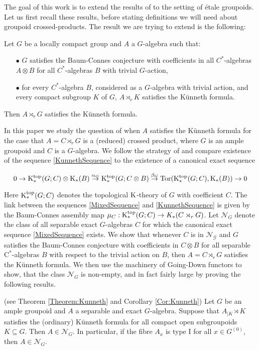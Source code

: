 The goal of this work is to extend the results of \cite{ChabertEOY} to the setting of \'etale groupoids. Let us first recall these results, before stating definitions we will need about groupoid crossed-products. The result we are trying to extend is the following:

\begin{thm} Let $G$ be a locally compact group and $A$ a $G$-algebra such that:
\begin{itemize}
\item[$\bullet$] $G$ satisfies the Baum-Connes conjecture with coefficients in all $C^*$-algebras $A\otimes B$ for all $C^*$-algebras $B$ with trivial $G$-action,
\item[$\bullet$] for every $C^*$-algebra $B$, considered as a $G$-algebra with trivial action, and every compact subgroup $K$ of $G$, $A\rtimes_r K$ satisfies the Künneth formula.
\end{itemize}
Then $A\rtimes_r G$ satisfies the Künneth formula.
\end{thm}

In this paper we study the question of when $A$ satisfies the Künneth formula for the case that $A=C\rtimes_r G$ is a (reduced) crossed product, where $G$ is an ample groupoid and $C$ is a $G$-algebra.
	We follow the strategy of \cite{CEO} and compare existence of the sequence \ref{KunnethSequence} to the existence of a canonical exact sequence

		\begin{equation}\label{MixedSequence}
		0\rightarrow \mathrm K_*^{\mathrm{top}}(G;C)\otimes\mathrm K_*(B)\stackrel{\alpha_G}{\rightarrow}\mathrm K_*^{\mathrm{top}}(G;C\otimes B)\stackrel{\beta_G}{\rightarrow}\mathrm{Tor}(\mathrm K_*^{\mathrm{top}}(G;C),\mathrm K_*(B))\rightarrow 0\\
		\end{equation}

	Here $\mathrm K_*^{\mathrm{top}}(G;C)$ denotes the topological $\mathrm K$-theory of $G$ with coefficient $C$. The link between the sequences \ref{MixedSequence} and \ref{KunnethSequence} is given by the Baum-Connes assembly map $\mu_C:\mathrm K_*^{\mathrm{top}}(G;C)\rightarrow K_*(C\rtimes_r G)$.
	Let $\mathcal{N}_G$ denote the class of all separable exact $G$-algebras $C$ for which the canonical exact sequence \ref{MixedSequence} exists. We show that whenever $C$ is in $\mathcal{N_G}$ and $G$ satisfies the Baum-Connes conjecture with coefficients in $C\otimes B$ for all separable $\mathrm{C}^*$-algebras $B$ with respect to the trivial action on $B$, then $A=C\rtimes_r G$ satisfies the Künneth formula.
	We then use the machinery of Going-Down functors to show, that the class $\mathcal{N}_G$ is non-empty, and in fact fairly large by proving the following results.
	\begin{thmx}(see Theorem \ref{Theorem:Kunneth} and Corollary \ref{Cor:Kunneth})
		Let $G$ be an ample groupoid and $A$ a separable and exact $G$-algebra. Suppose that $A_{\mid K}\rtimes K$ satisfies the (ordinary) Künneth formula for all compact open subgroupoids $K\subseteq G$. Then $A\in \mathcal{N}_G$. In particular, if the fibre $A_x$ is type I for all $x\in G^{(0)}$, then $A\in \mathcal{N}_G$.
	\end{thmx}
	

